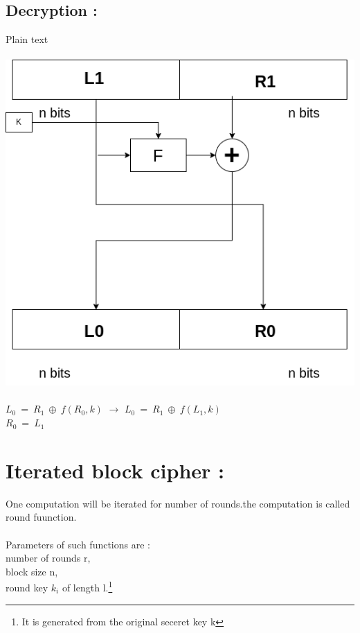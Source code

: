 \documentclass[11pt]{article}
\begin{document}
\begin{multicols}{2}
\subsection{Decryption :}
Plain text \\\\
\includegraphics[scale =0.3]{Images/L4/L4_Crypto_FN1.drawio.png}\\\\
$L_0\ =\ R_1\ \oplus\ f(R_0,k)$ $\rightarrow$ $L_0\ =\ R_1\ \oplus\ f(L_1,k)$ \\
$R_0\ =\ L_1$\\
\end{multicols}

\newpage


\section{Iterated block cipher :}
One computation will be iterated for number of rounds.the computation is called round fuunction.\\\\
Parameters of such functions are : \\
number of rounds r,\\
block size n,\\
round key $k_i$ of length l.\footnote{It is generated from the original seceret key k}\\
\end{document}
